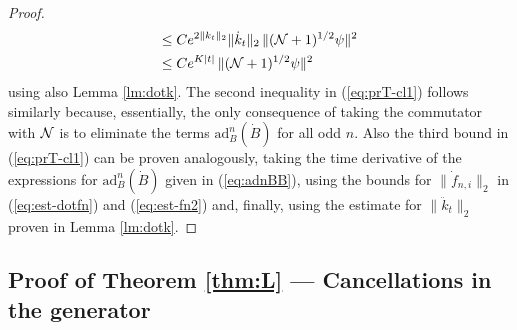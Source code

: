 \documentclass[11pt,a4paper]{article}
\newcommand{\ech}[2]{#2}	%
\newcommand{\ekt}{e^{K\lvert t\rvert}}	%
\newcommand{\cN}{{\cal N}}
\begin{document}
\begin{proof}
\[\begin{split}
\leq \; & C e^{2\| k_t \|_2} \| \dot{k}_t \|_2 \, \| (\cN+1)^{1/2} \psi \|^2 \\
\leq \; & C \ech{\| \varphi_t^{(N)} \|_{H^2}}{\ekt} \, \| (\cN+1)^{1/2} \psi \|^2 
\end{split}
\]
using also Lemma \ref{lm:dotk}. The second inequality in (\ref{eq:prT-cl1}) follows similarly because, essentially, the only consequence of taking the commutator with $\cN$ is to eliminate the terms $\text{ad}^n_B (\dot{B})$ for all odd $n$. Also the third bound in (\ref{eq:prT-cl1}) can be proven analogously, taking the time derivative of the expressions for $\text{ad}^n_B (\dot{B})$ given in (\ref{eq:adnBB}), using the bounds for $\| \dot f_{n,i} \|_2$ in (\ref{eq:est-dotfn}) and (\ref{eq:est-fn2}) and, finally, using the estimate for $\| \ddot k_t \|_2$ proven in Lemma \ref{lm:dotk}.
\end{proof}

\subsection{Proof of Theorem \ref{thm:L} --- Cancellations in the generator}
\label{sub:thmL}
\end{document}
